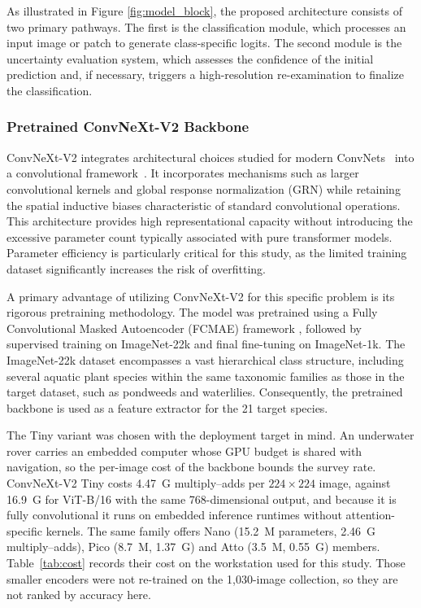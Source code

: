 \documentclass[final,3p,times,twocolumn]{elsarticle}
\begin{document}
As illustrated in Figure \ref{fig:model_block}, the proposed architecture consists of two primary pathways. The first is the classification module, which processes an input image or patch to generate class-specific logits. The second module is the uncertainty evaluation system, which assesses the confidence of the initial prediction and, if necessary, triggers a high-resolution re-examination to finalize the classification.

\subsubsection{Pretrained ConvNeXt-V2 Backbone}

ConvNeXt-V2 integrates architectural choices studied for modern ConvNets~\cite{liu2022convnet} into a convolutional framework~\cite{Wooetal2023}. It incorporates mechanisms such as larger convolutional kernels and global response normalization (GRN) while retaining the spatial inductive biases characteristic of standard convolutional operations. This architecture provides high representational capacity without introducing the excessive parameter count typically associated with pure transformer models. Parameter efficiency is particularly critical for this study, as the limited training dataset significantly increases the risk of overfitting.

A primary advantage of utilizing ConvNeXt-V2 for this specific problem is its rigorous pretraining methodology. The model was pretrained using a Fully Convolutional Masked Autoencoder (FCMAE) framework \cite{Wooetal2023}, followed by supervised training on ImageNet-22k and final fine-tuning on ImageNet-1k. The ImageNet-22k dataset encompasses a vast hierarchical class structure, including several aquatic plant species within the same taxonomic families as those in the target dataset, such as pondweeds and waterlilies. Consequently, the pretrained backbone is used as a feature extractor for the 21 target species.

The Tiny variant was chosen with the deployment target in mind. An underwater rover carries an embedded computer whose GPU budget is shared with navigation, so the per-image cost of the backbone bounds the survey rate. ConvNeXt-V2 Tiny costs 4.47~G multiply--adds per $224\times 224$ image, against 16.9~G for ViT-B/16 with the same 768-dimensional output, and because it is fully convolutional it runs on embedded inference runtimes without attention-specific kernels. The same family offers Nano (15.2~M parameters, 2.46~G multiply--adds), Pico (8.7~M, 1.37~G) and Atto (3.5~M, 0.55~G) members. Table~\ref{tab:cost} records their cost on the workstation used for this study. Those smaller encoders were not re-trained on the 1{,}030-image collection, so they are not ranked by accuracy here.
\end{document}
